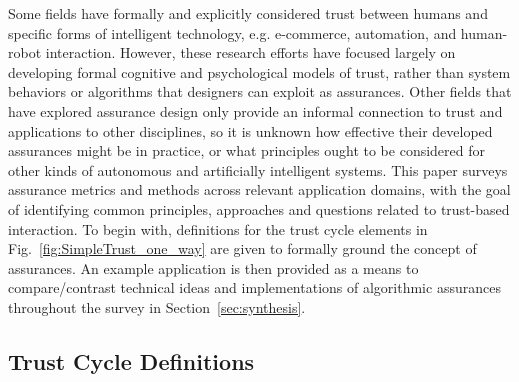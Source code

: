 Some fields have formally and explicitly considered trust between humans and specific forms of intelligent technology, e.g. e-commerce, automation, and human-robot interaction. However, these research efforts have focused largely on developing formal cognitive and psychological models of trust, rather than system behaviors or algorithms that designers can exploit as assurances. 
Other fields that have explored assurance design only provide an informal connection to trust and applications to other disciplines, so it is unknown how effective their developed assurances might be in practice, or what principles ought to be considered for other kinds of autonomous and artificially intelligent systems. 
This paper surveys assurance metrics and methods across relevant application domains, with the goal of
identifying common principles, approaches and questions related to trust-based interaction.
To begin with, definitions for the trust cycle elements in Fig.~\ref{fig:SimpleTrust_one_way} are given to formally ground the concept of assurances. An example application is then provided as a means to compare/contrast technical ideas and implementations of algorithmic assurances throughout the survey in Section~\ref{sec:synthesis}. 


\subsection{Trust Cycle Definitions} \label{sec:trust_definitions}
 


